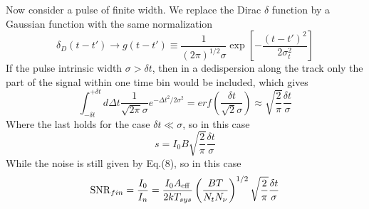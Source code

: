 \documentclass[twocolumn]{aastex61}
\begin{document}
Now consider a pulse of finite width. We replace the Dirac $\delta$ function by a Gaussian function with the same normalization
\begin{equation}
\delta _D(t-t') \to g(t-t') \equiv \frac{1}{(2\pi)^{1/2} \sigma} \exp[-\frac{(t-t')^2}{2\sigma^2_t}]
\end{equation}
If the pulse intrinsic width $\sigma > \delta t$, then in a dedispersion along the track only the part of the signal within one time bin would be included, which gives
\begin{equation}
\int^{+\delta t}_{-\delta t} d \Delta t\frac{1}{\sqrt{2\pi }\sigma}e^{-\Delta t^2 /2\sigma^2}=erf(\frac{\delta t}{\sqrt{2}\sigma})\approx\sqrt{\frac{2}{\pi}}\frac{\delta t}{\sigma}
\end{equation}
Where the last holds for the case $\delta t \ll \sigma$, so in this case
\begin{equation}
s =I_0B\sqrt{\frac{2}{\pi}}\frac{\delta t}{\sigma}
\end{equation}
While the noise is still given by Eq.(8), so in this case
\begin{equation}
{\rm SNR}_{fin} = \frac{I_0}{I_n}=\frac{I_0A_{\rm eff}}{2kT_{sys}}\left( \frac{BT}{N_t N_{\nu}} \right) ^{1/2} \sqrt{\frac{2}{\pi}}\frac{\delta t}{\sigma}
\end{equation}
\\ \\
\end{document}
